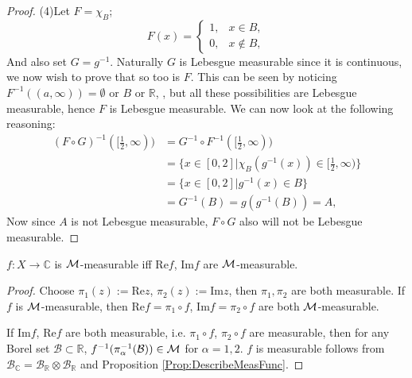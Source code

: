 \begin{proof}
    (4)Let $F=\chi_{B}$;
    \begin{equation}
        F(x)=\left\{
            \begin{array}{rl}
                1, &x\in B, \\
                0, &x\notin B,
            \end{array}
        \right.
    \end{equation}
    And also set $G=g^{-1}$. Naturally $G$ is Lebesgue measurable 
    since it is continuous, we now wish to prove that so too is $F$. 
    This can be seen by noticing $F^{-1}((a,\infty))=\emptyset$ or $B$
    or $\mathbb{R}$, , but all these possibilities are Lebesgue measurable,
    hence $F$ is Lebesgue measurable. We can now look at the following 
    reasoning:
    \begin{displaymath}
        \begin{array}{rl}
            (F\circ G)^{-1}([\frac{1}{2},\infty))&=G^{-1}\circ F^{-1}([\frac{1}{2},\infty))\\
            &=\{x\in[0,2]|\chi_B(g^{-1}(x))\in[\frac{1}{2},\infty)\} \\
            &=\{x\in[0,2]|g^{-1}(x)\in B\} \\
            &=G^{-1}(B)=g(g^{-1}(B))=A,
        \end{array}
    \end{displaymath}
    Now since $A$ is not Lebesgue measurable, 
    $F\circ G$ also will not be Lebesgue measurable.
\end{proof}
\begin{prop}
    \label{Prop:ComplexMeasurableFunc}
    $f:X\rightarrow\mathbb{C}$ is $\mathcal{M}$-measurable iff $\text{Re}f$, 
    $\text{Im}f$ are $\mathcal{M}$-measurable. 
\end{prop}
\begin{proof}
    Choose $\pi_{1}(z):=\text{Re}z$, $\pi_{2}(z):=\text{Im}z$, 
    then $\pi_{1},\pi_{2}$ are both measurable. If $f$ is 
    $\mathcal{M}$-measurable, 
    then $\text{Re}f=\pi_{1}\circ f$, $\text{Im}f=\pi_{2}\circ f$ 
    are both $\mathcal{M}$-measurable.

    If $\text{Im}f$, $\text{Re}f$ are both measurable, i.e. 
    $\pi_1\circ f$, $\pi_{2}\circ f$ are measurable, then for 
    any Borel set $\mathcal{B}\subset\mathbb{R}$, 
    $f^{-1}(\pi_{\alpha}^{-1}(\mathcal{B}))\in\mathcal{M}$ for 
    $\alpha=1,2$. $f$ is measurable 
    follows from $\mathcal{B}_{\mathbb{C}}
    =\mathcal{B}_{\mathbb{R}}\otimes
    \mathcal{B}_{\mathbb{R}}$ and 
    Proposition \ref{Prop:DescribeMeasFunc}.
\end{proof}
